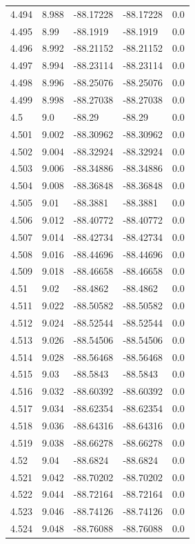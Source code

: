 \begin{tabular}{lllll}
4.494 & 8.988 & -88.17228 & -88.17228 & 0.0 \\
4.495 & 8.99 & -88.1919 & -88.1919 & 0.0 \\
4.496 & 8.992 & -88.21152 & -88.21152 & 0.0 \\
4.497 & 8.994 & -88.23114 & -88.23114 & 0.0 \\
4.498 & 8.996 & -88.25076 & -88.25076 & 0.0 \\
4.499 & 8.998 & -88.27038 & -88.27038 & 0.0 \\
4.5 & 9.0 & -88.29 & -88.29 & 0.0 \\
4.501 & 9.002 & -88.30962 & -88.30962 & 0.0 \\
4.502 & 9.004 & -88.32924 & -88.32924 & 0.0 \\
4.503 & 9.006 & -88.34886 & -88.34886 & 0.0 \\
4.504 & 9.008 & -88.36848 & -88.36848 & 0.0 \\
4.505 & 9.01 & -88.3881 & -88.3881 & 0.0 \\
4.506 & 9.012 & -88.40772 & -88.40772 & 0.0 \\
4.507 & 9.014 & -88.42734 & -88.42734 & 0.0 \\
4.508 & 9.016 & -88.44696 & -88.44696 & 0.0 \\
4.509 & 9.018 & -88.46658 & -88.46658 & 0.0 \\
4.51 & 9.02 & -88.4862 & -88.4862 & 0.0 \\
4.511 & 9.022 & -88.50582 & -88.50582 & 0.0 \\
4.512 & 9.024 & -88.52544 & -88.52544 & 0.0 \\
4.513 & 9.026 & -88.54506 & -88.54506 & 0.0 \\
4.514 & 9.028 & -88.56468 & -88.56468 & 0.0 \\
4.515 & 9.03 & -88.5843 & -88.5843 & 0.0 \\
4.516 & 9.032 & -88.60392 & -88.60392 & 0.0 \\
4.517 & 9.034 & -88.62354 & -88.62354 & 0.0 \\
4.518 & 9.036 & -88.64316 & -88.64316 & 0.0 \\
4.519 & 9.038 & -88.66278 & -88.66278 & 0.0 \\
4.52 & 9.04 & -88.6824 & -88.6824 & 0.0 \\
4.521 & 9.042 & -88.70202 & -88.70202 & 0.0 \\
4.522 & 9.044 & -88.72164 & -88.72164 & 0.0 \\
4.523 & 9.046 & -88.74126 & -88.74126 & 0.0 \\
4.524 & 9.048 & -88.76088 & -88.76088 & 0.0 \\

\end{tabular}
